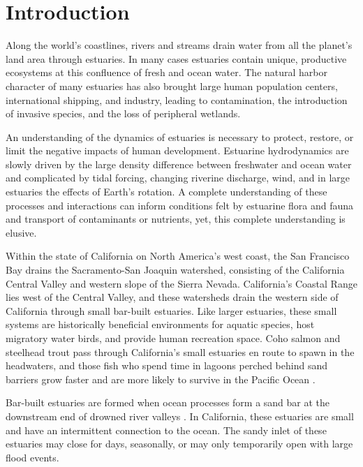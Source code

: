 \chapter{Introduction}
\label{chIntro}

Along the world's coastlines, rivers and streams drain water from all the planet's land area through estuaries.  In many cases estuaries contain unique, productive ecosystems at this confluence of fresh and ocean water. The natural harbor character of many estuaries has also brought large human population centers, international shipping, and industry, leading to contamination, the introduction of invasive species, and the loss of peripheral wetlands. 

An understanding of the dynamics of estuaries is necessary to protect, restore, or limit the negative impacts of human development. Estuarine hydrodynamics are slowly driven by the large density difference between freshwater and ocean water and complicated by tidal forcing, changing riverine discharge, wind, and in large estuaries the effects of Earth's rotation. A complete understanding of these processes and interactions can inform conditions felt by estuarine flora and fauna and transport of contaminants or nutrients, yet, this complete understanding is elusive.

Within the state of California on North America's west coast, the San Francisco Bay drains the Sacramento-San Joaquin watershed, consisting of the California Central Valley and western slope of the Sierra Nevada. California's Coastal Range lies west of the Central Valley, and these watersheds drain the western side of California through small bar-built estuaries. Like larger estuaries, these small systems are historically beneficial environments for aquatic species, host migratory water birds, and provide human recreation space. Coho salmon and steelhead trout pass through California's small estuaries en route to spawn in the headwaters, and those fish who spend time in lagoons perched behind sand barriers grow faster and are more likely to survive in the Pacific Ocean \parencite{hayes_steelhead_2008, bond_marine_2008}. 

Bar-built estuaries are formed when ocean processes form a sand bar at the downstream end of drowned river valleys \parencite{nielsen_coastal_2009}. In California, these estuaries are small and have an intermittent connection to the ocean. The sandy inlet of these estuaries may close for days, seasonally, or may only temporarily open with large flood events. 

